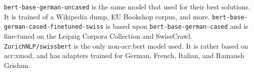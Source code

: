 \texttt{bert-base-german-uncased} \citep{DbmdzBertbasegermanuncasedHugging} is the same model that \cite{scherrerHeLjuVarDial20202020} used for their best solutions. It is trained of a Wikipedia dump, EU Bookshop corpus, and more. \texttt{bert-base-german-cased-finetuned-swiss} is based upon \texttt{bert-base-german-cased} and is fine-tuned on the Leipzig Corpora Collection and SwissCrawl. \texttt{ZurichNLP/swissbert} is the only non-\acrshort{acr:bert} model used. It is rather based on \acrshort{acr:xmod}, and has adapters trained for German, French, Italian, and Ramansh Grishun.